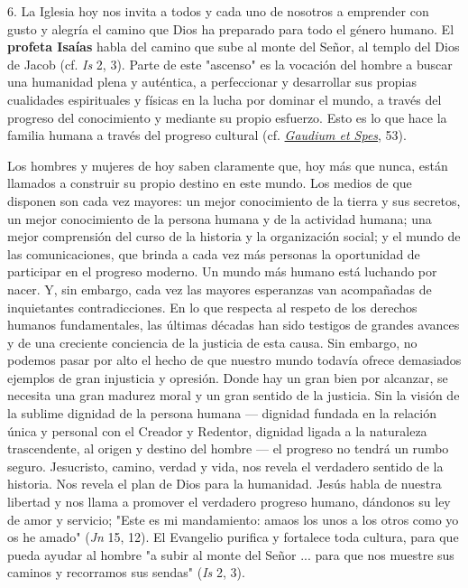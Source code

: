 6. La Iglesia hoy nos invita a todos y cada uno de nosotros a emprender
con gusto y alegría el camino que Dios ha preparado para todo el género
humano. El \textbf{profeta Isaías} habla del camino que sube al monte
del Señor, al templo del Dios de Jacob (cf. \emph{Is} 2, 3). Parte de
este "ascenso" es la vocación del hombre a buscar una humanidad plena y
auténtica, a perfeccionar y desarrollar sus propias cualidades
espirituales y físicas en la lucha por dominar el mundo, a través del
progreso del conocimiento y mediante su propio esfuerzo. Esto es lo que
hace la familia humana a través del progreso cultural (cf.
\href{http://www.vatican.va/archive/hist_councils/ii_vatican_council/documents/vat-ii_const_19651207_gaudium-et-spes_it.html}{\emph{\emph{Gaudium
			et Spes}}}, 53).

Los hombres y mujeres de hoy saben claramente que, hoy más que nunca,
están llamados a construir su propio destino en este mundo. Los medios
de que disponen son cada vez mayores: un mejor conocimiento de la tierra
y sus secretos, un mejor conocimiento de la persona humana y de la
actividad humana; una mejor comprensión del curso de la historia y la
organización social; y el mundo de las comunicaciones, que brinda a cada
vez más personas la oportunidad de participar en el progreso moderno. Un
mundo más humano está luchando por nacer. Y, sin embargo, cada vez las
mayores esperanzas van acompañadas de inquietantes contradicciones. En
lo que respecta al respeto de los derechos humanos fundamentales, las
últimas décadas han sido testigos de grandes avances y de una creciente
conciencia de la justicia de esta causa. Sin embargo, no podemos pasar
por alto el hecho de que nuestro mundo todavía ofrece demasiados
ejemplos de gran injusticia y opresión. Donde hay un gran bien por
alcanzar, se necesita una gran madurez moral y un gran sentido de la
justicia. Sin la visión de la sublime dignidad de la persona humana
--- dignidad fundada en la relación única y personal con el Creador
y Redentor, dignidad ligada a la naturaleza trascendente, al origen y
destino del hombre --- el progreso no tendrá un rumbo seguro.
Jesucristo, camino, verdad y vida, nos revela el verdadero sentido de la
historia. Nos revela el plan de Dios para la humanidad. Jesús habla de
nuestra libertad y nos llama a promover el verdadero progreso humano,
dándonos su ley de amor y servicio; "Este es mi mandamiento: amaos los
unos a los otros como yo os he amado" (\emph{Jn} 15, 12). El Evangelio
purifica y fortalece toda cultura, para que pueda ayudar al hombre "a
subir al monte del Señor ... para que nos muestre sus caminos y
recorramos sus sendas" (\emph{Is} 2, 3).

